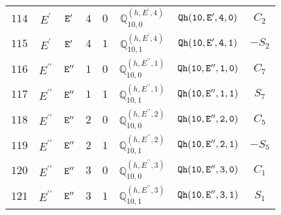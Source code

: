 \documentclass[fleqn,8pt]{jsarticle}
\begin{document}
\begin{table}[ht!]
\begin{center}
\begin{tabular}{cccccccc}
$ 114 $ & $ E^{\prime} $ & $ {\tt E'} $ & $ 4 $ & $ 0 $ & $ \mathbb{Q}_{10,0}^{(h,E^{\prime},4)} $ & $ {\tt Qh(10,E',4,0)} $ & $ C_{2} $ \\
$ 115 $ & $ E^{\prime} $ & $ {\tt E'} $ & $ 4 $ & $ 1 $ & $ \mathbb{Q}_{10,1}^{(h,E^{\prime},4)} $ & $ {\tt Qh(10,E',4,1)} $ & $ - S_{2} $ \\
$ 116 $ & $ E^{\prime\prime} $ & $ {\tt E''} $ & $ 1 $ & $ 0 $ & $ \mathbb{Q}_{10,0}^{(h,E^{\prime\prime},1)} $ & $ {\tt Qh(10,E'',1,0)} $ & $ C_{7} $ \\
$ 117 $ & $ E^{\prime\prime} $ & $ {\tt E''} $ & $ 1 $ & $ 1 $ & $ \mathbb{Q}_{10,1}^{(h,E^{\prime\prime},1)} $ & $ {\tt Qh(10,E'',1,1)} $ & $ S_{7} $ \\
$ 118 $ & $ E^{\prime\prime} $ & $ {\tt E''} $ & $ 2 $ & $ 0 $ & $ \mathbb{Q}_{10,0}^{(h,E^{\prime\prime},2)} $ & $ {\tt Qh(10,E'',2,0)} $ & $ C_{5} $ \\
$ 119 $ & $ E^{\prime\prime} $ & $ {\tt E''} $ & $ 2 $ & $ 1 $ & $ \mathbb{Q}_{10,1}^{(h,E^{\prime\prime},2)} $ & $ {\tt Qh(10,E'',2,1)} $ & $ - S_{5} $ \\
$ 120 $ & $ E^{\prime\prime} $ & $ {\tt E''} $ & $ 3 $ & $ 0 $ & $ \mathbb{Q}_{10,0}^{(h,E^{\prime\prime},3)} $ & $ {\tt Qh(10,E'',3,0)} $ & $ C_{1} $ \\
$ 121 $ & $ E^{\prime\prime} $ & $ {\tt E''} $ & $ 3 $ & $ 1 $ & $ \mathbb{Q}_{10,1}^{(h,E^{\prime\prime},3)} $ & $ {\tt Qh(10,E'',3,1)} $ & $ S_{1} $ \\
 \hline \hline
\end{tabular}
\end{center}
\end{table}
\end{document}
